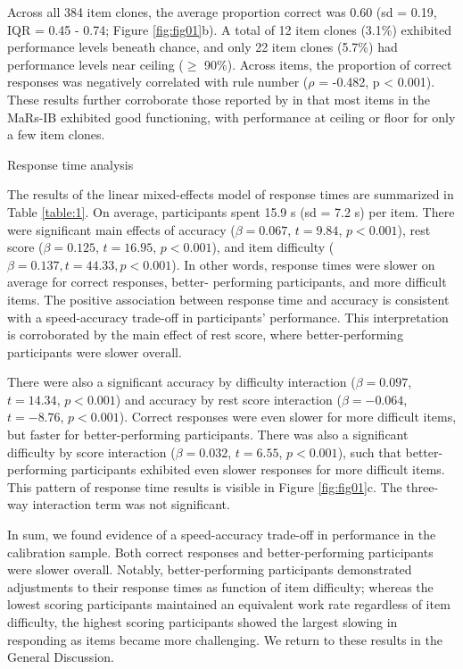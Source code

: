 \documentclass[a4paper,man,natbib,noextraspace]{apa6}
\makeatletter
\renewcommand{\subsubsection}{\@startsection{subsubsection}{3}
  {\z@}%
  {\b@level@two@skip}{\e@level@two@skip}%
  {\normalfont\normalsize\bfseries}}
\makeatother
\begin{document}
Across all 384 item clones, the average proportion correct was 0.60 (sd = 0.19, IQR = 0.45 - 0.74; Figure \ref{fig:fig01}b). A total of 12 item clones (3.1\%) exhibited performance levels beneath chance, and only 22 item clones (5.7\%) had performance levels near ceiling ($\geq$ 90\%). Across items, the proportion of correct responses was negatively correlated with rule number ($\rho$ = -0.482, p < 0.001). These results further corroborate those reported by \cite{chierchia2019matrix} in that most items in the MaRs-IB exhibited good functioning, with performance at ceiling or floor for only a few item clones. 

\subsubsection{Response time analysis}

The results of the linear mixed-effects model of response times are summarized in Table \ref{table:1}. On average, participants spent 15.9 s (sd = 7.2 s) per item. There were significant main effects of accuracy ($\beta = 0.067$, $t = 9.84$, $p < 0.001$), rest score ($\beta = 0.125$, $t = 16.95$, $p < 0.001$), and item difficulty ($\beta = 0.137, t = 44.33, p < 0.001$). In other words, response times were slower on average for correct responses, better- performing participants, and more difficult items. The positive association between response time and accuracy is consistent with a speed-accuracy trade-off in participants' performance. This interpretation is corroborated by the main effect of rest score, where better-performing participants were slower overall. 

There were also a significant accuracy by difficulty interaction ($\beta = 0.097$, $t = 14.34$, $p < 0.001$) and accuracy by rest score interaction ($\beta = -0.064$, $t = -8.76$, $p < 0.001$). Correct responses were even slower for more difficult items, but faster for better-performing participants. There was also a significant difficulty by score interaction ($\beta = 0.032$, $t = 6.55$, $p < 0.001$), such that better-performing participants exhibited even slower responses for more difficult items. This pattern of response time results is visible in Figure \ref{fig:fig01}c. The three-way interaction term was not significant. 

In sum, we found evidence of a speed-accuracy trade-off in performance in the calibration sample. Both correct responses and better-performing participants were slower overall. Notably, better-performing participants demonstrated adjustments to their response times as function of item difficulty; whereas the lowest scoring participants maintained an equivalent work rate regardless of item difficulty, the highest scoring participants showed the largest slowing in responding as items became more challenging. We return to these results in the General Discussion. 
\end{document}
